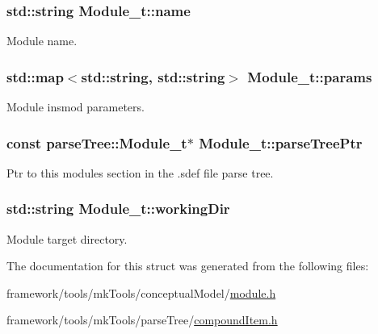 \subsubsection[{\texorpdfstring{name}{name}}]{\setlength{\rightskip}{0pt plus 5cm}std\+::string Module\+\_\+t\+::name}\hypertarget{struct_module__t_ababb92d168b2607d249930f55659793f}{}\label{struct_module__t_ababb92d168b2607d249930f55659793f}


Module name. 

\subsubsection[{\texorpdfstring{params}{params}}]{\setlength{\rightskip}{0pt plus 5cm}std\+::map$<$std\+::string, std\+::string$>$ Module\+\_\+t\+::params}\hypertarget{struct_module__t_a59452388827cc8e3ea6fd8742248a2e2}{}\label{struct_module__t_a59452388827cc8e3ea6fd8742248a2e2}


Module insmod parameters. 

\subsubsection[{\texorpdfstring{parse\+Tree\+Ptr}{parseTreePtr}}]{\setlength{\rightskip}{0pt plus 5cm}const {\bf parse\+Tree\+::\+Module\+\_\+t}$\ast$ Module\+\_\+t\+::parse\+Tree\+Ptr}\hypertarget{struct_module__t_af4fa6eed6c58b97550fb9c86260122b0}{}\label{struct_module__t_af4fa6eed6c58b97550fb9c86260122b0}
Ptr to this module\textquotesingle{}s section in the .sdef file parse tree. 
\subsubsection[{\texorpdfstring{working\+Dir}{workingDir}}]{\setlength{\rightskip}{0pt plus 5cm}std\+::string Module\+\_\+t\+::working\+Dir}\hypertarget{struct_module__t_aba486a8cf8b76fe4f120ab2665cf81e0}{}\label{struct_module__t_aba486a8cf8b76fe4f120ab2665cf81e0}


Module target directory. 



The documentation for this struct was generated from the following files\+:\begin{DoxyCompactItemize}
\item 
framework/tools/mk\+Tools/conceptual\+Model/\hyperlink{module_8h}{module.\+h}\item 
framework/tools/mk\+Tools/parse\+Tree/\hyperlink{compound_item_8h}{compound\+Item.\+h}\end{DoxyCompactItemize}
